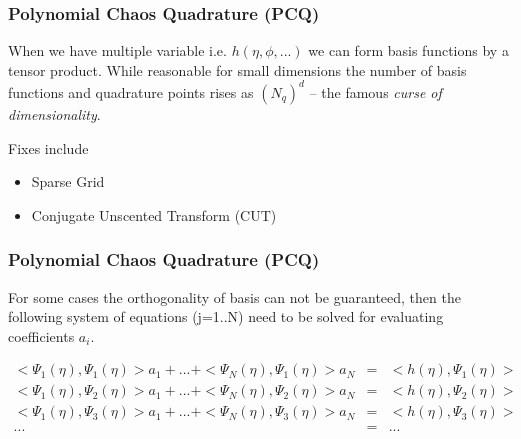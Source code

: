 \documentclass[10pt]{beamer}
\begin{document}
\begin{frame}
\frametitle{Polynomial Chaos Quadrature (PCQ)}
When we have multiple variable i.e. $h(\eta,\phi, ...)$ we can form basis functions by a tensor product. While reasonable for small dimensions the
number of basis functions and quadrature points rises as $(N_q)^d$ -- the famous {\it curse of dimensionality}. 

Fixes include
\begin{itemize}
\item Sparse Grid
\item Conjugate Unscented Transform (CUT)
\end{itemize}
\end{frame}
\begin{frame}
\frametitle{Polynomial Chaos Quadrature (PCQ)}
For some cases the orthogonality of basis can not be guaranteed, then the following system of equations (j=1..N)  need to be solved for evaluating coefficients $a_i$.

\begin{eqnarray*}
   < \Psi_1 (\eta), \Psi_1 (\eta)>a_1+ ... +<\Psi_N(\eta),\Psi_1(\eta)> a_N  &= &<h(\eta), \Psi_1(\eta) > \\
   < \Psi_1 (\eta), \Psi_2 (\eta)> a_1+ ... +<\Psi_N(\eta),\Psi_2(\eta)> a_N    &=& <h(\eta), \Psi_2 (\eta) > \\
   < \Psi_1 (\eta), \Psi_3 (\eta)> a_1+ ... +<\Psi_N(\eta),\Psi_3(\eta)> a_N    &=& <h(\eta), \Psi_3 (\eta) > \\
   ... &=  & ... \\
\end{eqnarray*}
\end{frame}
\end{document}
